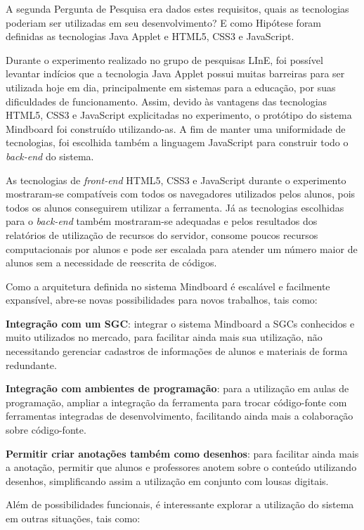 A segunda Pergunta de Pesquisa era dados estes requisitos, quais as tecnologias poderiam ser utilizadas em seu desenvolvimento? E como Hipótese foram definidas as tecnologias Java Applet e HTML5, CSS3 e JavaScript.

Durante o experimento realizado no grupo de pesquisas LInE, foi possível levantar indícios que a tecnologia Java Applet possui muitas barreiras para ser utilizada hoje em dia, principalmente em sistemas para a educação, por suas dificuldades de funcionamento. Assim, devido às vantagens das tecnologias HTML5, CSS3 e JavaScript explicitadas no experimento, o protótipo do sistema Mindboard foi construído utilizando-as. A fim de manter uma uniformidade de tecnologias, foi escolhida também a linguagem JavaScript para construir todo o \emph{back-end} do sistema.

As tecnologias de \emph{front-end} HTML5, CSS3 e JavaScript durante o experimento mostraram-se compatíveis com todos os navegadores utilizados pelos alunos, pois todos os alunos conseguirem utilizar a ferramenta. Já as tecnologias escolhidas para o \emph{back-end} também mostraram-se adequadas e pelos resultados dos relatórios de utilização de recursos do servidor, consome poucos recursos computacionais por alunos e pode ser escalada para atender um número maior de alunos sem a necessidade de reescrita de códigos.

Como a arquitetura definida no sistema Mindboard é escalável e facilmente expansível, abre-se novas possibilidades para novos trabalhos, tais como:

\textbf{Integração com um SGC}: integrar o sistema Mindboard a SGCs conhecidos e muito utilizados no mercado, para facilitar ainda mais sua utilização, não necessitando gerenciar cadastros de informações de alunos e materiais de forma redundante.

\textbf{Integração com ambientes de programação}: para a utilização em aulas de programação, ampliar a integração da ferramenta para trocar código-fonte com ferramentas integradas de desenvolvimento, facilitando ainda mais a colaboração sobre código-fonte.

\textbf{Permitir criar anotações também como desenhos}: para facilitar ainda mais a anotação, permitir que alunos e professores anotem sobre o conteúdo utilizando desenhos, simplificando assim a utilização em conjunto com lousas digitais.

Além de possibilidades funcionais, é interessante explorar a utilização do sistema em outras situações, tais como:

